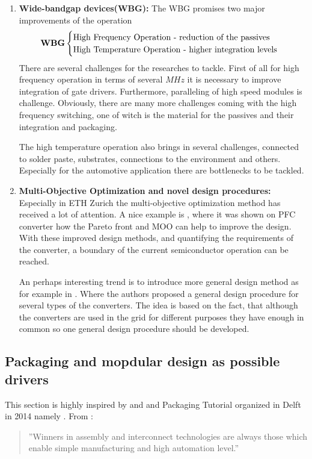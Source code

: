 \documentclass[]{scrartcl}
\begin{document}
\begin{enumerate}
	\item \textbf{Wide-bandgap devices(WBG):} The WBG promises two major improvements of the operation
	\begin{equation*}
	\text{\textbf{WBG}} \begin{cases}
	\text{High Frequency Operation - reduction of the passives } \\
	\text{High Temperature Operation - higher integration levels} 
	\end{cases}
	\end{equation*} 
	There are several challenges for the researches to tackle. First of all for high frequency operation in terms of several $MHz$ it is necessary to improve integration of gate drivers. Furthermore, paralleling of high speed modules is challenge. Obviously, there are many more challenges coming with the high frequency switching, one of witch is the material for the passives and their integration and packaging. 
	
	The high temperature operation also brings in several challenges, connected to solder paste, substrates, connections to the environment and others. Especially for the automotive application there are bottlenecks to be tackled. 
	
	\item \textbf{Multi-Objective Optimization and novel design procedures:} Especially in ETH Zurich the multi-objective optimization method has received a lot of attention. A nice example is \cite{Kolar2009}, where it was shown on PFC converter how the Pareto front and MOO can help to improve the design. With these improved design methods, and quantifying the requirements of the converter, a boundary of the current semiconductor operation can be reached. 
	
	An perhaps interesting trend is to introduce more general design method as for example in \cite{Ortjohann2009}. Where the authors proposed a general design procedure for several types of the converters. The idea is based on the fact, that although the converters are used in the grid for different purposes they have enough in common so one general design procedure should be developed. 
	
	\end{enumerate}
	\subsection{Packaging and mopdular design as possible drivers}
This section is highly inspired by \cite{Pavlovsky2006} and \cite{Popovic2005} and Packaging Tutorial organized in Delft in 2014 namely \cite{Bayerer}. 
From \cite{Bayerer}: \begin{quote}
	''Winners in assembly and interconnect technologies are always those which enable simple manufacturing and high automation level.''
\end{quote}
\end{document}
